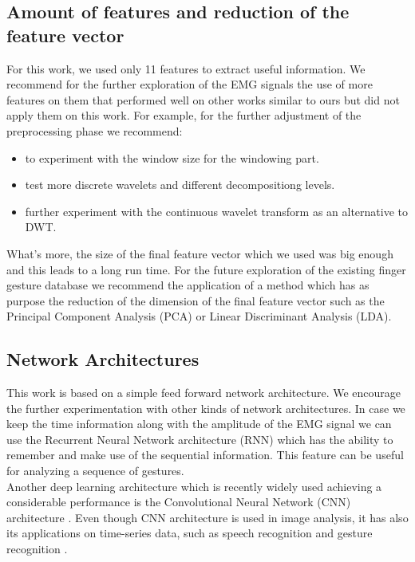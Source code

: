 \subsection{Amount of features and reduction of the feature vector}
For this work, we used only 11 features to extract useful information. We recommend for the further exploration of the EMG signals the use of more features on them that performed well on other works similar to ours but did not apply them on this work. For example, for the further adjustment of the preprocessing phase we recommend:
\begin{itemize}
\item to experiment with the window size for the windowing part.
\item test more discrete wavelets and different decompositiong levels.
\item further experiment with the continuous wavelet transform as an alternative to DWT.
\end{itemize}
What's more, the size of the final feature vector which we used was big enough and this leads to a long run time. For the future exploration of the existing finger gesture database we recommend the application of a method which has as purpose the reduction of the dimension of the final feature vector such as the Principal Component Analysis (PCA) or Linear Discriminant  Analysis (LDA).
\subsection{Network Architectures}
This work is based on a simple feed forward network architecture. We encourage the further experimentation with other kinds of network architectures. In case we keep the time information along with the amplitude of the EMG signal we can use the Recurrent Neural Network architecture (RNN) which has the ability to remember and make use of the sequential information. This feature can be useful for analyzing a sequence of gestures.\\
Another deep learning architecture which is recently widely used achieving a considerable performance is the Convolutional Neural Network (CNN) architecture \cite{schmidhuber_deep_2015, he_deep_2016}. Even though CNN architecture is used in image analysis, it has also its applications on time-series data, such as speech recognition \cite{qian_very_2016} and gesture recognition \cite{atzori_deep_2016} . 
